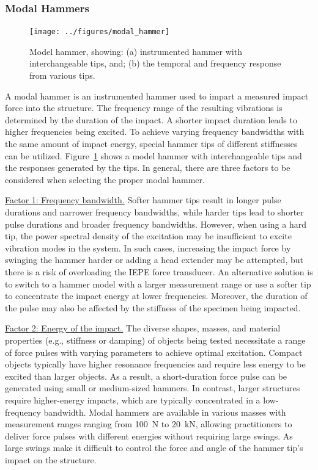 \documentclass[12pt,letter]{article}
\begin{document}
\subsubsection{Modal Hammers}



\begin{figure}[H]
	\centering
	\texttt{[image: ../figures/modal\_hammer]}
	\caption{Model hammer, showing: (a) instrumented hammer with interchangeable tips, and; (b) the temporal and frequency response from various tips.}
	\label{fig:modal_hammer}
\end{figure} 


A modal hammer is an instrumented hammer used to impart a measured impact force into the structure. The frequency range of the resulting vibrations is determined by the duration of the impact. A shorter impact duration leads to higher frequencies being excited. To achieve varying frequency bandwidths with the same amount of impact energy, special hammer tips of different stiffnesses can be utilized.  Figure~\ref{fig:modal_hammer} shows a model hammer with interchangeable tips and the responses generated by the tips. In general, there are three factors to be considered when selecting the proper modal hammer.

\underline{Factor 1: Frequency bandwidth.} Softer hammer tips result in longer pulse durations and narrower frequency bandwidths, while harder tips lead to shorter pulse durations and broader frequency bandwidths. However, when using a hard tip, the power spectral density of the excitation may be insufficient to excite vibration modes in the system. In such cases, increasing the impact force by swinging the hammer harder or adding a head extender may be attempted, but there is a risk of overloading the IEPE force transducer. An alternative solution is to switch to a hammer model with a larger measurement range or use a softer tip to concentrate the impact energy at lower frequencies. Moreover, the duration of the pulse may also be affected by the stiffness of the specimen being impacted.

\underline{Factor 2: Energy of the impact.} The diverse shapes, masses, and material properties (e.g., stiffness or damping) of objects being tested necessitate a range of force pulses with varying parameters to achieve optimal excitation. Compact objects typically have higher resonance frequencies and require less energy to be excited than larger objects. As a result, a short-duration force pulse can be generated using small or medium-sized hammers. In contrast, larger structures require higher-energy impacts, which are typically concentrated in a low-frequency bandwidth. Modal hammers are available in various masses with measurement ranges ranging from 100~N to 20~kN, allowing practitioners to deliver force pulses with different energies without requiring large swings. As large swings make it difficult to control the force and angle of the hammer tip's impact on the structure.
\end{document}

